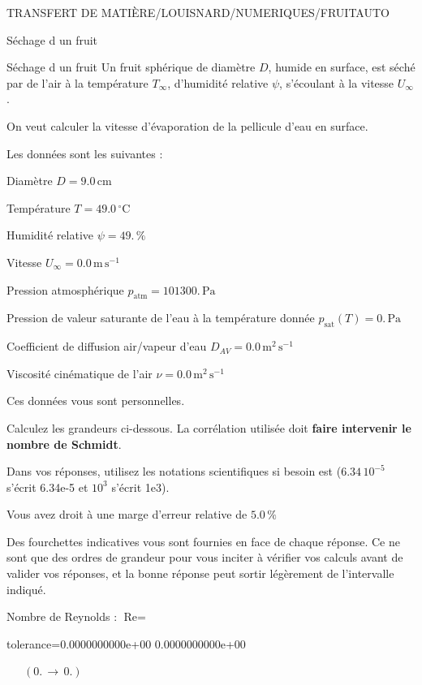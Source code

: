 \documentclass[12pt]{article}
\begin{document}
\begin{quiz}{TRANSFERT DE MATIÈRE/LOUISNARD/NUMERIQUES/FRUITAUTO}
\begin{cloze}{Séchage d un fruit}
\end{cloze} 


 \begin{cloze}{Séchage d un fruit} 
Un fruit sphérique de diamètre $D$, humide en surface, est séché par de l'air à la température $T_\infty$, d'humidité relative $\psi$, s'écoulant à la vitesse $U_\infty$.

On veut calculer la vitesse d'évaporation de la pellicule d'eau en surface.

 

Les données sont les suivantes :

 

Diamètre $D = 9.0\,  \mathrm{cm} $

Température $T = 49.0\,  \mathrm{^\circ\mathrm{C}} $

Humidité relative $\psi = 49.\, \% $

Vitesse $U_\infty = 0.0\,  \mathrm{m}\,  \mathrm{s}^{-1} $

Pression atmosphérique $p_{\text{atm}} = 101300.\,  \mathrm{Pa} $

Pression de valeur saturante de l’eau à la température donnée $p_{\text{sat}}(T) = 0.\,  \mathrm{Pa} $

Coefficient de diffusion air/vapeur d’eau $D_{AV} = 0.0\,  \mathrm{m}^{2}\,  \mathrm{s}^{-1} $

Viscosité cinématique de l’air $\nu = 0.0\,  \mathrm{m}^{2}\,  \mathrm{s}^{-1} $

Ces données vous sont personnelles.

 

Calculez les grandeurs ci-dessous. La corrélation utilisée doit \textbf{faire intervenir le nombre de Schmidt}.

Dans vos réponses, utilisez les notations scientifiques si besoin est ($6.34\, 10^{-5}$ s'écrit 6.34e-5 et $10^{3}$ s'écrit 1e3).

Vous avez droit à une marge d'erreur relative de $5.0\, \% $

Des fourchettes indicatives vous sont fournies en face de chaque réponse. Ce ne sont que des ordres de grandeur pour vous inciter à vérifier vos calculs avant de valider vos réponses, et la bonne réponse peut sortir légèrement de l'intervalle indiqué.

 

Nombre de Reynolds : $\text{Re} =  $
\begin{numerical}[points=1] 
\item[tolerance={0.0000000000e+00}] 0.0000000000e+00 
\end{numerical} 
 $\,$ 
 $ \quad (0. \, \rightarrow \, 0.) $ 


\end{cloze}
\end{quiz}
\end{document}
